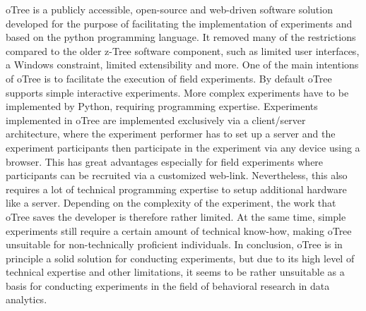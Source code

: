 oTree is a publicly accessible, open-source and web-driven software solution developed for the purpose of facilitating the implementation of experiments and based on the python programming language. %
It removed many of the restrictions compared to the older z-Tree software component, such as limited user interfaces, a Windows constraint, limited extensibility and more. %
One of the main intentions of oTree is to facilitate the execution of field experiments.
By default oTree supports simple interactive experiments. More complex experiments have to be implemented by Python, requiring programming expertise. Experiments implemented in oTree are implemented exclusively via a client/server architecture, where the experiment performer has to set up a server and the experiment participants then participate in the experiment via any device using a browser. This has great advantages especially for field experiments where participants can be recruited via a customized web-link. Nevertheless, this also requires a lot of technical programming expertise to setup additional hardware like a server. Depending on the complexity of the experiment, the work that oTree saves the developer is therefore rather limited. At the same time, simple experiments still require a certain amount of technical know-how, making oTree unsuitable for non-technically proficient individuals. 
In conclusion, oTree is in principle a solid solution for conducting experiments, but due to its high level of technical expertise and other limitations, it seems to be rather unsuitable as a basis for conducting experiments in the field of behavioral research in data analytics. 

